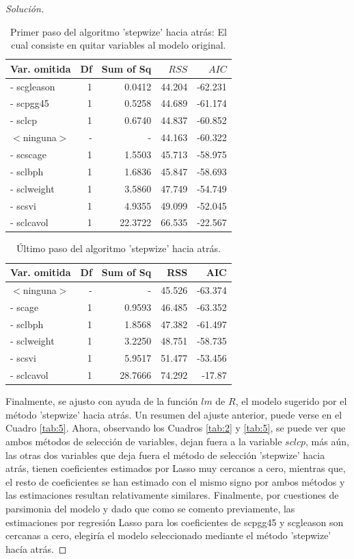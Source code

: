 \documentclass[10.5pt,notitlepage]{article}
\newenvironment{solucion}
  {\begin{proof}[Solución]}
  {\end{proof}}
\theoremstyle{plain}
\begin{document}
\begin{solucion}
\begin{table}[htb]
\begin{tabular}{@{}l@{\hskip 0.3in}r@{\hskip 0.3in}r@{\hskip 0.3in}r@{\hskip 0.3in}r@{}}
        \toprule
Var. omitida& Df& Sum of Sq&\(RSS\)&\(AIC\) \\  
        \midrule        
- scgleason & 1&    0.0412 &44.204& -62.231\\
- scpgg45  &  1&    0.5258 &44.689& -61.174\\
- sclcp    &  1&    0.6740 &44.837& -60.852\\
\(<\)ninguna\(>\)  &    -&   -        &44.163& -60.322\\
- scscage  &  1&    1.5503& 45.713& -58.975\\
- sclbph   &  1&    1.6836& 45.847& -58.693\\
- sclweight&  1&    3.5860& 47.749& -54.749\\
- scsvi    &  1&    4.9355& 49.099& -52.045\\
- sclcavol&   1&   22.3722& 66.535& -22.567\\
        \end{tabular}
    \caption{Primer paso del algoritmo 'stepwize' hacia atrás: El cual consiste en quitar variables al modelo original.}
    \label{tab:3}
\end{table}
\begin{table}[htb]
    \centering
        \centering
        \begin{tabular}{@{}l@{\hskip 0.3in}r@{\hskip 0.3in}r@{\hskip 0.3in}r@{\hskip 0.3in}r@{}}
        \toprule
Var. omitida& Df& Sum of Sq&    RSS&     AIC\\  
        \midrule        
\(<\)ninguna\(>\) &    -    &   -    & 45.526& -63.374\\
- scage  &    1   & 0.9593& 46.485& -63.352\\
- sclbph &    1   & 1.8568& 47.382& -61.497\\
- sclweight&  1   & 3.2250& 48.751& -58.735\\
- scsvi    &  1   & 5.9517& 51.477& -53.456\\
- sclcavol &  1   &28.7666& 74.292& -17.87\\
        \end{tabular}
    \caption{Último paso del algoritmo 'stepwize' hacia atrás.}
    \label{tab:4}
\end{table}
Finalmente, se ajusto con ayuda de la función \(lm\) de \(R\), el modelo sugerido por el método 'stepwize' hacia atrás. Un resumen del ajuste anterior, puede verse en el Cuadro \ref{tab:5}. Ahora, observando los Cuadros \ref{tab:2} y \ref{tab:5}, se puede ver que ambos métodos de selección de variables, dejan fuera a la variable \(sclcp\), más aún, las otras dos variables que deja fuera el método de selección 'stepwize' hacia atrás, tienen coeficientes estimados por Lasso muy cercanos a cero, mientras que, el resto de coeficientes se han estimado con el mismo signo por ambos métodos y las estimaciones resultan relativamente similares. Finalmente, por cuestiones de parsimonia del modelo y dado que como se comento previamente, las estimaciones por regresión Lasso para los coeficientes de scpgg45 y scgleason son cercanas a cero, elegiría el modelo seleccionado mediante el método 'stepwize' hacía atrás. 

\end{solucion}
\end{document}
